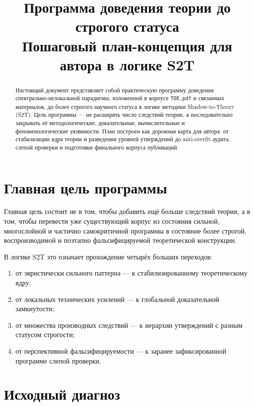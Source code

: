 \documentclass[12pt,a4paper]{article}
\title{Программа доведения теории до строгого статуса\\Пошаговый план-концепция для автора в логике S2T}
\author{}
\date{}
\begin{document}
\maketitle

\begin{abstract}
Настоящий документ представляет собой практическую программу доведения спектрально-нелокальной парадигмы, изложенной в корпусе \texttt{TOE.pdf} и связанных материалов, до более строгого научного статуса в логике методики Shadow-to-Theory (S2T). Цель программы --- не расширять число следствий теории, а последовательно закрывать её методологические, доказательные, вычислительные и феноменологические уязвимости. План построен как дорожная карта для автора: от стабилизации ядра теории и разведения уровней утверждений до anti-overfit аудита, слепой проверки и подготовки финального корпуса публикаций.
\end{abstract}

\section{Главная цель программы}

Главная цель состоит не в том, чтобы добавить ещё больше следствий теории, а в том, чтобы перевести уже существующий корпус из состояния сильной, многослойной и частично самокритичной программы в состояние более строгой, воспроизводимой и поэтапно фальсифицируемой теоретической конструкции.

В логике S2T это означает прохождение четырёх больших переходов:
\begin{enumerate}
    \item от эвристически сильного паттерна --- к стабилизированному теоретическому ядру;
    \item от локальных технических усилений --- к глобальной доказательной замкнутости;
    \item от множества производных следствий --- к иерархии утверждений с разным статусом строгости;
    \item от перспективной фальсифицируемости --- к заранее зафиксированной программе слепой проверки.
\end{enumerate}

\section{Исходный диагноз}
\end{document}
